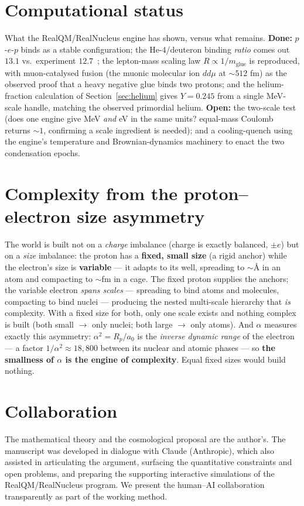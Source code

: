 \documentclass[11pt]{article}
\begin{document}
\section{Computational status}\label{sec:comp}
What the RealQM/RealNucleus engine has shown, versus what remains. \textbf{Done:} $p$-$e$-$p$ binds as
a stable configuration; the He-4/deuteron binding \emph{ratio} comes out $13.1$ vs.\ experiment
$12.7$~\cite{realnucleus}; the lepton-mass scaling law $R\propto1/m_{\text{glue}}$ is reproduced, with
muon-catalysed fusion (the muonic molecular ion $dd\mu$ at ${\sim}512$ fm) as the observed proof that a
heavy negative glue binds two protons; and the helium-fraction calculation of
Section~\ref{sec:helium} gives $Y=0.245$ from a single MeV-scale handle, matching the observed
primordial helium. \textbf{Open:} the two-scale test (does one engine give MeV \emph{and} eV in the
same units? equal-mass Coulomb returns ${\sim}1$, confirming a scale ingredient is needed); and a
cooling-quench using the engine's temperature and Brownian-dynamics machinery to
enact the two condensation epochs.

\section{Complexity from the proton--electron size asymmetry}\label{sec:complexity}
The world is built not on a \emph{charge} imbalance (charge is exactly balanced, $\pm e$) but on a
\emph{size} imbalance: the proton has a \textbf{fixed, small size} (a rigid anchor) while the electron's
size is \textbf{variable} --- it adapts to its well, spreading to ${\sim}$\AA{} in an atom and compacting
to ${\sim}$fm in a cage. The fixed proton supplies the anchors; the variable electron \emph{spans scales}
--- spreading to bind atoms and molecules, compacting to bind nuclei --- producing the nested multi-scale
hierarchy that \emph{is} complexity. With a fixed size for both, only one scale exists and nothing complex
is built (both small $\to$ only nuclei; both large $\to$ only atoms). And $\alpha$ measures exactly this
asymmetry: $\alpha^2=R_p/a_0$ is the \emph{inverse dynamic range} of the electron --- a factor
$1/\alpha^2\approx18{,}800$ between its nuclear and atomic phases --- so \textbf{the smallness of $\alpha$
is the engine of complexity}. Equal fixed sizes would build nothing.

\section{Collaboration}\label{sec:collab}
The mathematical theory and the cosmological proposal are the author's. The manuscript was developed
in dialogue with Claude (Anthropic), which also assisted in articulating the argument, surfacing the
quantitative constraints and open problems, and preparing the supporting interactive simulations of
the RealQM/RealNucleus program. We present the human--AI collaboration transparently as part of the
working method.
\end{document}
